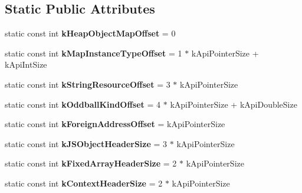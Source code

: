 \subsection*{Static Public Attributes}
\begin{DoxyCompactItemize}
\item 
\mbox{\label{classv8_1_1internal_1_1Internals_a0902a596b5656b4592157eaacc020512}} 
static const int {\bfseries k\+Heap\+Object\+Map\+Offset} = 0
\item 
\mbox{\label{classv8_1_1internal_1_1Internals_a39ea290dfaa9de300bd79aa73a874a88}} 
static const int {\bfseries k\+Map\+Instance\+Type\+Offset} = 1 $\ast$ k\+Api\+Pointer\+Size + k\+Api\+Int\+Size
\item 
\mbox{\label{classv8_1_1internal_1_1Internals_a8c2b35069864f567ca0c571310dd90a1}} 
static const int {\bfseries k\+String\+Resource\+Offset} = 3 $\ast$ k\+Api\+Pointer\+Size
\item 
\mbox{\label{classv8_1_1internal_1_1Internals_a98685d6861a07139720cd296f94f2b73}} 
static const int {\bfseries k\+Oddball\+Kind\+Offset} = 4 $\ast$ k\+Api\+Pointer\+Size + k\+Api\+Double\+Size
\item 
\mbox{\label{classv8_1_1internal_1_1Internals_ad4134449ee39b95e5ac035996aa7d66b}} 
static const int {\bfseries k\+Foreign\+Address\+Offset} = k\+Api\+Pointer\+Size
\item 
\mbox{\label{classv8_1_1internal_1_1Internals_af8faf3ff3271d26bafa6ca0ea87e2a57}} 
static const int {\bfseries k\+J\+S\+Object\+Header\+Size} = 3 $\ast$ k\+Api\+Pointer\+Size
\item 
\mbox{\label{classv8_1_1internal_1_1Internals_a715ca62a5ddceac28d43c470db067675}} 
static const int {\bfseries k\+Fixed\+Array\+Header\+Size} = 2 $\ast$ k\+Api\+Pointer\+Size
\item 
\mbox{\label{classv8_1_1internal_1_1Internals_aa5187d7653158ef851c53594e6e63851}} 
static const int {\bfseries k\+Context\+Header\+Size} = 2 $\ast$ k\+Api\+Pointer\+Size

\end{DoxyCompactItemize}
